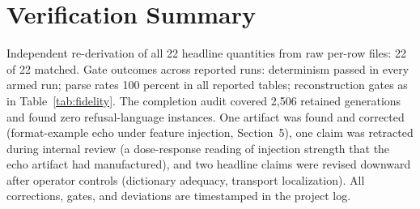 \documentclass[11pt]{article}
\begin{document}
\section{Verification Summary}
Independent re-derivation of all 22 headline quantities from raw per-row files: 22 of 22 matched. Gate outcomes across reported runs: determinism passed in every armed run; parse rates 100 percent in all reported tables; reconstruction gates as in Table~\ref{tab:fidelity}. The completion audit covered 2,506 retained generations and found zero refusal-language instances. One artifact was found and corrected (format-example echo under feature injection, Section~5), one claim was retracted during internal review (a dose-response reading of injection strength that the echo artifact had manufactured), and two headline claims were revised downward after operator controls (dictionary adequacy, transport localization). All corrections, gates, and deviations are timestamped in the project log.
\end{document}
